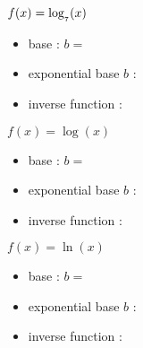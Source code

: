 
{
    $f(x) = \myLog[7](x)$   
    \hfill{}
    \tcblower
    \begin{itemize}[fullwidth,nosep]
        \setlength\itemsep{1em}
        \item base : $b=$
        \item exponential base $b$ : 
        \item inverse function : 
    \end{itemize}
}

\myProblemsWithContent
{
    $f(x) = \log(x)$    
    \hfill{}  
    \tcblower
    \begin{itemize}[fullwidth,nosep]
        \setlength\itemsep{1em}
        \item base : $b=$
        \item exponential base $b$ : 
        \item inverse function : 
    \end{itemize}
}
{
    $f(x) = \ln(x)$     
    \hfill{}
    \tcblower
    \begin{itemize}[fullwidth,nosep]
        \setlength\itemsep{1em}
        \item base : $b=$
        \item exponential base $b$ : 
        \item inverse function : 
    \end{itemize}
}
